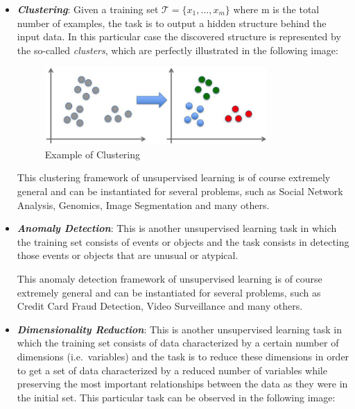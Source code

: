 \begin{itemize}
      \item \emph{\textbf{Clustering}}: Given a training set
            $\mathcal{T}=\{x_1,...,x_m\}$ where m is the total number
            of examples, the task is to output a hidden structure
            behind the input data. In this particular case the
            discovered structure is represented by the so-called
            \emph{clusters}, which are perfectly illustrated in the
            following image:

            \vspace{5mm}

            \begin{figure}[h]
                  \centering
                  \includegraphics[width=0.8\textwidth]{../img/Clustering_example}
                  \caption{Example of Clustering}
            \end{figure}

            \vspace{5mm}

            This clustering framework of unsupervised learning is of
            course extremely general and can be instantiated for
            several problems, such as Social Network Analysis, Genomics,
            Image Segmentation and many others.

      \item \emph{\textbf{Anomaly Detection}}: This is another
            unsupervised learning task in which the training set consists
            of events or objects and the task consists in detecting those
            events or objects that are unusual or atypical.

            This anomaly detection framework of unsupervised learning
            is of course extremely general and can be instantiated for
            several problems, such as Credit Card Fraud Detection,
            Video Surveillance and many others.

            \newpage

      \item \emph{\textbf{Dimensionality Reduction}}: This is another
            unsupervised learning task in which the training set consists
            of data characterized by a certain number of dimensions
            (i.e.\ variables) and the task is to reduce these dimensions
            in order to get a set of data characterized by a reduced
            number of variables while preserving the most important
            relationships between the data as they were in the initial
            set. This particular task can be observed in the following
            image:


\end{itemize}
